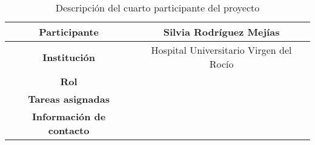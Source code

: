 \begin{table}[H]
    \centering
    \begin{tabular}{|c|c|}
    \hline
    \textbf{Participante} & Silvia Rodríguez Mejías \\
    \hline
    \textbf{Institución} & Hospital Universitario Virgen del Rocío \\
    \hline
    \textbf{Rol} &  \\
    \hline
    \textbf{Tareas asignadas} & \\
    \hline
    \textbf{Información de contacto} & \\
    \hline
    \end{tabular}
\caption{Descripción del cuarto participante del proyecto}
\label{tab:trazabilidadAlum}
\end{table}